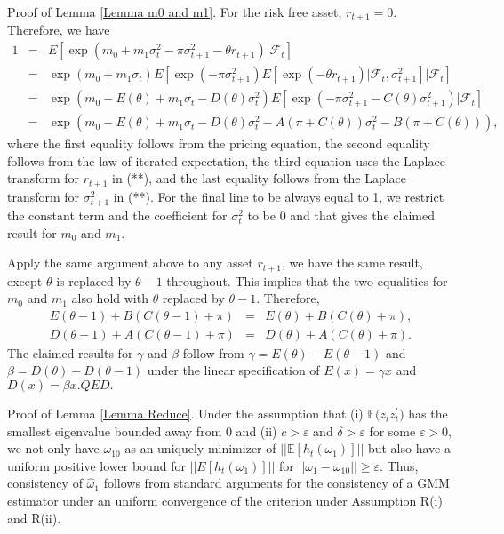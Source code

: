 \documentclass[11pt]{article}
\begin{document}
\noindent Proof of Lemma \ref{Lemma m0 and m1}. For the risk free asset, $%
r_{t+1}=0.$ Therefore, we have%
\begin{eqnarray*}
1 &=&E\left[ \exp \left( m_{0}+m_{1}\sigma _{t}^{2}-\pi \sigma
_{t+1}^{2}-\theta r_{t+1}\right) |\mathcal{F}_{t}\right]  \\
&=&\exp (m_{0}+m_{1}\sigma _{t})E\left[ \exp \left( -\pi \sigma
_{t+1}^{2}\right) E\left[ \exp \left( -\theta r_{t+1}\right) |\mathcal{F}%
_{t},\sigma _{t+1}^{2}\right] |\mathcal{F}_{t}\right]  \\
&=&\exp (m_{0}-E\left( \theta \right) +m_{1}\sigma _{t}-D\left( \theta
\right) \sigma _{t}^{2})E\left[ \exp \left( -\pi \sigma _{t+1}^{2}-C\left(
\theta \right) \sigma _{t+1}^{2}\right) |\mathcal{F}_{t}\right]  \\
&=&\exp (m_{0}-E\left( \theta \right) +m_{1}\sigma _{t}-D\left( \theta
\right) \sigma _{t}^{2}-A\left( \pi +C\left( \theta \right) \right) \sigma
_{t}^{2}-B\left( \pi +C\left( \theta \right) \right) ),
\end{eqnarray*}%
where the first equality follows from the pricing equation, the second
equality follows from the law of iterated expectation, the third equation
uses the Laplace transform for $r_{t+1}$ in (**), and the last equality
follows from the Laplace transform for $\sigma _{t+1}^{2}$ in (**). For the
final line to be always equal to 1, we restrict the constant term and the
coefficient for $\sigma _{t}^{2}$ to be 0 and that gives the claimed result
for $m_{0}$ and $m_{1}.$

Apply the same argument above to any asset $r_{t+1}$, we have the same
result, except $\theta $ is replaced by $\theta -1$ throughout. This implies
that the two equalities for $m_{0}$ and $m_{1}$ also hold with $\theta $
replaced by $\theta -1.$ Therefore, 
\begin{eqnarray*}
E(\theta -1)+B\left( C\left( \theta -1\right) +\pi \right)  &=&E(\theta
)+B\left( C\left( \theta \right) +\pi \right) , \\
D\left( \theta -1\right) +A\left( C\left( \theta -1\right) +\pi \right) 
&=&D\left( \theta \right) +A\left( C\left( \theta \right) +\pi \right) .
\end{eqnarray*}%
The claimed results for $\gamma $ and $\beta $ follow from $\gamma =E(\theta
)-E(\theta -1)$ and $\beta =D(\theta )-D(\theta -1)$ under the linear
specification of $E(x)=\gamma x$ and $D(x)=\beta x.$\qquad $QED.$

\bigskip

\noindent Proof of Lemma \ref{Lemma Reduce}. Under the assumption that (i) $%
\mathbb{E(}z_{t}z_{t}^{\prime })$ has the smallest eigenvalue bounded away
from 0 and (ii) $c>\varepsilon $ and $\delta >\varepsilon $ for some $%
\varepsilon >0,$ we not only have $\omega _{10}$ as an uniquely minimizer of 
$||\mathbb{E}[h_{t}(\omega _{1})]||$ but also have a uniform positive lower
bound for $||E[h_{t}(\omega _{1})]||$ for $||\omega _{1}-\omega _{10}||\geq
\varepsilon .$ Thus, consistency of $\widehat{\omega }_{1}$ follows from
standard arguments for the consistency of a GMM estimator under an uniform
convergence of the criterion under Assumption R(i) and R(ii).
\end{document}
